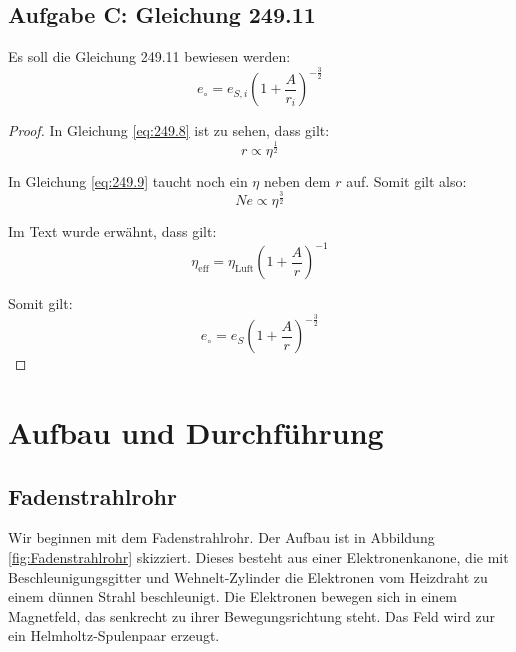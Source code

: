 \documentclass[11pt, ngerman]{article}
\begin{document}
\subsection{Aufgabe C: Gleichung 249.11}

Es soll die Gleichung 249.11 bewiesen werden:
\[ e_\circ = e_{S, i} \left( 1 + \frac A{r_i} \right)^{-\frac 32} \]

\begin{proof}
	In Gleichung \eqref{eq:249.8} ist zu sehen, dass gilt:
	\[ r \propto \eta^{\frac 12} \]

	In Gleichung \eqref{eq:249.9} taucht noch ein $\eta$ neben dem $r$ auf.
	Somit gilt also:
	\[ N e \propto \eta^{\frac 32} \]

	Im Text wurde erwähnt, dass gilt:
	\[ \eta_\text{eff} = \eta_\text{Luft} \left( 1 + \frac Ar \right)^{-1} \]

	Somit gilt:
	\[ e_\circ = e_S \left( 1 + \frac Ar \right)^{-\frac 32} \]
\end{proof}


\section{Aufbau und Durchführung}

\subsection{Fadenstrahlrohr}

Wir beginnen mit dem Fadenstrahlrohr. Der Aufbau ist in Abbildung
\ref{fig:Fadenstrahlrohr} skizziert. Dieses besteht aus einer Elektronenkanone,
die mit Beschleunigungsgitter und Wehnelt-Zylinder die Elektronen vom Heizdraht
zu einem dünnen Strahl beschleunigt. Die Elektronen bewegen sich in einem
Magnetfeld, das senkrecht zu ihrer Bewegungsrichtung steht. Das Feld wird zur
ein Helmholtz-Spulenpaar erzeugt.
\end{document}
